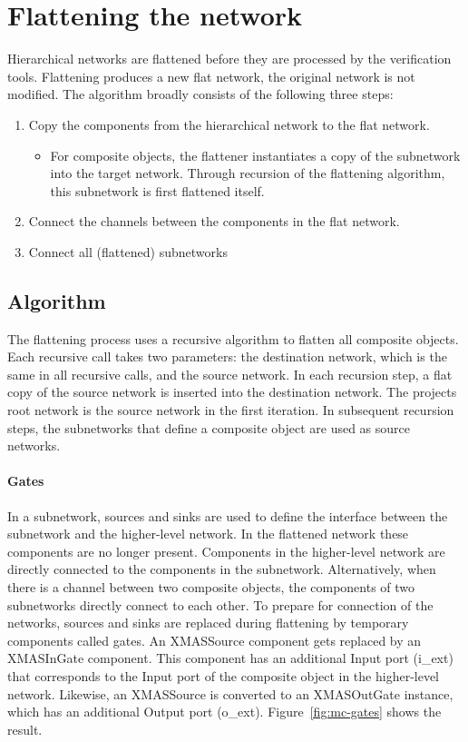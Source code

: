 \section{Flattening the network}

Hierarchical networks are flattened before they are processed by the verification
tools. Flattening produces a new flat network, the original network is not modified.
The algorithm broadly consists of the following three steps:
\begin{enumerate}
 \item Copy the components from the hierarchical network to the flat network.
 \begin{itemize}
  \item For composite objects, the flattener instantiates a copy of the subnetwork
  into the target network. Through recursion of the flattening algorithm, this
  subnetwork is first flattened itself.
 \end{itemize}
 \item Connect the channels between the components in the flat network.
 \item Connect all (flattened) subnetworks
\end{enumerate}


\subsection{Algorithm}
The flattening process uses a recursive algorithm to flatten all composite objects.
Each recursive call takes two parameters: the destination network, which is the same
in all recursive calls, and the source network. In each recursion step, a flat copy
of the source network is inserted into the destination network. The projects root
network is the source network in the first iteration. In subsequent recursion steps,
the subnetworks that define a composite object are used as source networks.

\paragraph{Gates}
In a subnetwork, sources and sinks are used to define the interface between the
subnetwork and the higher-level network. In the flattened network these components
are no longer present. Components in the higher-level network are directly connected
to the components in the subnetwork. Alternatively, when there is a channel between two
composite objects, the components of two subnetworks directly connect to each other.
To prepare for connection of the networks, sources and sinks are replaced during
flattening by temporary components called gates. An XMASSource component gets replaced
by an XMASInGate component. This component has an additional Input port (i\_ext) that
corresponds to the Input port of the composite object in the higher-level network.
Likewise, an XMASSource is converted to an XMASOutGate instance, which has an
additional Output port (o\_ext). Figure~\ref{fig:mc-gates} shows the result.

